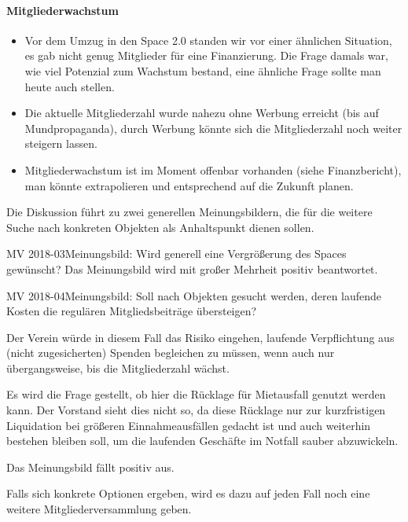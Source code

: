 \documentclass{s0minutes}
\begin{document}
\paragraph{Mitgliederwachstum}
\begin{itemize}
  \item Vor dem Umzug in den Space 2.0 standen wir vor einer ähnlichen
    Situation, es gab nicht genug Mitglieder für eine Finanzierung. Die Frage
    damals war, wie viel Potenzial zum Wachstum bestand, eine ähnliche Frage
    sollte man heute auch stellen.
  \item Die aktuelle Mitgliederzahl wurde nahezu ohne Werbung erreicht
    (bis auf Mundpropaganda), durch Werbung könnte sich die Mitgliederzahl noch
    weiter steigern lassen.
  \item Mitgliederwachstum ist im Moment offenbar vorhanden (siehe
    Finanzbericht), man könnte extrapolieren und entsprechend auf die Zukunft
    planen.
\end{itemize}

Die Diskussion führt zu zwei generellen Meinungsbildern, die für die weitere
Suche nach konkreten Objekten als Anhaltspunkt dienen sollen.

\begin{resolution}{MV 2018-03}{\consensus{\adopted}}{Meinungsbild: Wird
  generell eine Vergrößerung des Spaces gewünscht?}{}
  Das Meinungsbild wird mit großer Mehrheit positiv beantwortet.
\end{resolution}

\begin{resolution}{MV 2018-04}{\consensus{\adopted}}{Meinungsbild: Soll nach
  Objekten gesucht werden, deren laufende Kosten die regulären
  Mitgliedsbeiträge übersteigen?}{}

  Der Verein würde in diesem Fall das Risiko eingehen, laufende Verpflichtung
  aus (nicht zugesicherten) Spenden begleichen zu müssen, wenn auch nur
  übergangsweise, bis die Mitgliederzahl wächst.

  Es wird die Frage gestellt, ob hier die Rücklage für Mietausfall
  genutzt werden kann. Der Vorstand sieht dies nicht so, da diese Rücklage nur
  zur kurzfristigen Liquidation bei größeren Einnahmeausfällen gedacht ist und
  auch weiterhin bestehen bleiben soll, um die laufenden Geschäfte im Notfall
  sauber abzuwickeln.

  Das Meinungsbild fällt positiv aus.
\end{resolution}

Falls sich konkrete Optionen ergeben, wird es dazu auf jeden Fall noch eine
weitere Mitgliederversammlung geben.
\end{document}
